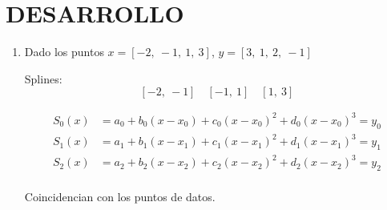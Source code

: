 \documentclass[12pt]{article}
\begin{document}
\section*{DESARROLLO}

\begin{enumerate}
    \item Dado los puntos \( x = [-2,\ -1,\ 1,\ 3] \), \( y = [3,\ 1,\ 2,\ -1] \)
    \begin{enumerate}

        Splines:
        \[[-2,\ -1]\quad [-1,\ 1] \quad [1,\ 3]\]

        \[ 
        \begin{aligned}
            S_0(x) &= a_0 + b_0 (x-x_0) + c_0 (x-x_0)^2 + d_0 (x-x_0)^3 = y_0 \\
            S_1(x) &= a_1 + b_1 (x-x_1) + c_1 (x-x_1)^2 + d_1 (x-x_1)^3 = y_1\\
            S_2(x) &= a_2 + b_2 (x-x_2) + c_2 (x-x_2)^2 + d_2 (x-x_2)^3 = y_2\\ 
        \end{aligned}
        \]

        Coincidencian con los puntos de datos.


\end{enumerate}
\end{enumerate}
\end{document}
